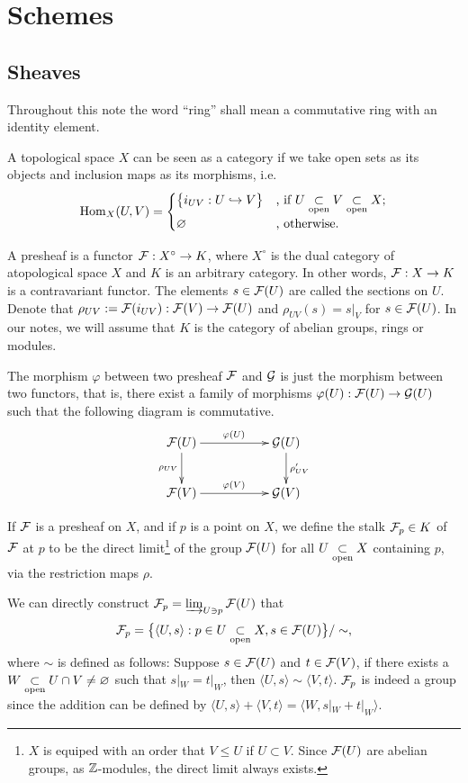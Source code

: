 \documentclass[10pt]{extbook}
\begin{document}
\setcounter{chapter}{1}
\chapter{Schemes}
\section{Sheaves}
Throughout this note the word ``ring'' shall mean a commutative ring with an identity 
element.

\para A topological space $X$ can be seen as a category if we take open sets as its 
objects 
and inclusion maps as its morphisms, i.e. 
\[
	\operatorname{Hom}_{X}(U,V)=\begin{cases}
	\bigl\{i_{UV}:U\hookrightarrow V\bigr\}&\text{, if }U\underset{\mathrm{open}}{\subset} V\underset{\mathrm{open}}{\subset} X\text{;}\\
	\varnothing&\text{, otherwise}.
	\end{cases}
\]

\para A presheaf is a functor $\mathcal{F}:X^\circ\to K$, where $X^\circ$ is the dual category 
of atopological space $X$ and $K$ is an arbitrary category. In other words, $\mathcal{F}:X\to K$ 
is a contravariant functor. The elements $s\in \mathcal{F}(U)$ are called the sections on $U$. 
Denote that $\rho_{UV}:=\mathcal{F}(i_{UV}):\mathcal{F}(V)\to\mathcal{F}(U)$ and $\rho_{UV}(s)=s|_V$ for 
$s \in \mathcal{F}(U)$. In our notes, we will assume that $K$ is the category of abelian groups,
rings or modules.

The morphism $\varphi$ between two presheaf $\mathcal{F}$ and $\mathcal{G}$ is just the morphism between 
two functors, that is, there exist a family of morphisms $\varphi(U):\mathcal{F}(U)\to \mathcal{G}(U)$ 
such that the following diagram is commutative.
\[
	\xymatrix{
		\calf(U)\ar[rr]^{\varphi(U)} \ar[d]_{\rho_{UV}}&&\calg(U) \ar[d]^{\rho'_{UV}}\\
		\calf(V)\ar[rr]^{\varphi(V)}&&\calg(V)
	}
\]

\para If $\mathcal{F}$ is a presheaf on $X$, and if $p$ is a point on $X$, we define the stalk 
$\mathcal{F}_p\in K$ of $\mathcal{F}$ at $p$ to be the direct limit\footnote{$X$ is equiped with an 
order that $V\leq U$ if $U\subset V$. Since $\mathcal{F}(U)$ are abelian groups, as $\mathbb{Z}$-modules, 
the direct limit always exists.} of the group $\mathcal{F}(U)$ for all $U \underset{\mathrm{open}}{\subset} X$ containing $p$, 
via the restriction maps $\rho$.

We can directly construct $\mathcal{F}_p=\varinjlim_{U\ni p}\mathcal{F}(U)$ that 
\[
	\mathcal{F}_p=\bigl\{\langle U,s\rangle: p\in U\underset{\mathrm{open}}{\subset} X, s\in \mathcal{F}(U)\bigr\}/\sim,
\]
where $\sim$ is defined as follows: Suppose $s\in\mathcal{F}(U)$ and $t\in\mathcal{F}(V)$, if there 
exists a $W\underset{\mathrm{open}}{\subset} U\cap V\neq \varnothing$ such that $s|_W=t|_W$, then 
$\langle U,s\rangle\sim\langle V,t\rangle$. $\mathcal{F}_p$ is indeed a group since the 
addition can be defined by $\langle U,s\rangle+\langle V,t\rangle=\langle W,s|_W+t|_W\rangle$. 
\end{document}
